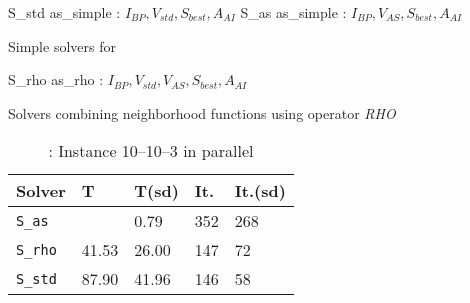\begin{algorithm}[t]
\dontprintsemicolon
\SetNoline
{}
 S\_std  as\_simple\;
\algoindent {} : $I_{BP}, V_{std}, S_{best}, A_{AI}$ \;
 S\_as  as\_simple\;
\algoindent {} : $I_{BP}, V_{AS}, S_{best}, A_{AI}$ \; 
\caption{Simple solvers for \SGP}\label{as:golfers10-10-3}
\end{algorithm}

\begin{algorithm}[H]
\dontprintsemicolon
\SetNoline
{}
 S\_rho  as\_rho\;
\algoindent {} : $I_{BP}, V_{std}, V_{AS}, S_{best}, A_{AI}$ \;
\caption{Solvers combining neighborhood functions using operator {\it RHO}}\label{as:golfers_rho}
\end{algorithm}

\begin{table}
\centering 
\renewcommand{\arraystretch}{1}
\begin{tabular}{p{4cm}|R{1.3cm}R{1.3cm}R{1.3cm}R{1.3cm}}
\hline
{\bf Solver} & T & T(sd) & It. & It.(sd) \\
\hline
\texttt{S\_as} &  & 0.79 & 352 & 268 \\		
\texttt{S\_rho} & 41.53 & 26.00 & 147 & 72\\
\texttt{S\_std} & 87.90 & 41.96 & 146 & 58 \\
\hline
\end{tabular}
\caption{\sg: Instance 10--10--3 in parallel}
\label{tab:golfers10-10-3}
\end{table}


